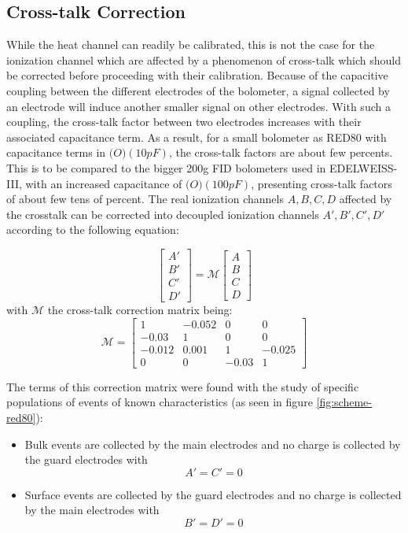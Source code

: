 \subsection{Cross-talk Correction}
\label{par:crosstalk}
While the heat channel can readily be calibrated, this is not the case for the ionization channel which are affected by a phenomenon of cross-talk which should be corrected before proceeding with their calibration.
Because of the capacitive coupling between the different electrodes of the bolometer, a signal collected by an electrode will induce another smaller signal on other electrodes. With such a coupling, the cross-talk factor between two electrodes increases with their associated capacitance term.
As a result, for a small bolometer as RED80 with capacitance terms in $\mathcal(O)(10 pF)$, the cross-talk factors are about few percents. This is to be compared to the bigger 200g FID bolometers used in EDELWEISS-III, with an increased capacitance of $\mathcal(O)(100 pF)$, presenting cross-talk factors of about few tens of percent.
The real ionization channels $A,B,C,D$ affected by the crosstalk can be corrected into decoupled ionization channels $A', B', C', D'$ according to the following equation:

\begin{equation}
	\left[\begin{array}{c}
	A' \\ 
	B' \\ 
	C' \\ 
	D'
	\end{array}\right]
	=
	\mathcal{M}
	\left[\begin{array}{c}
	A \\ 
	B \\ 
	C \\ 
	D
	\end{array} \right]
\end{equation}
with $\mathcal{M}$ the cross-talk correction matrix being:
\begin{equation}
	\mathcal{M}
	=
	\left[\begin{array}{cccc}
	1 & -0.052 & 0 & 0 \\ 
	-0.03 & 1 & 0 & 0 \\ 
	-0.012 & 0.001 & 1 & -0.025 \\ 
	0 & 0 & -0.03 & 1
	\end{array}\right]
\end{equation}

The terms of this correction matrix were found with the study of specific populations of events of known characteristics (as seen in figure \ref{fig:scheme-red80}):
\begin{itemize}
	\item Bulk events are collected by the main electrodes and no charge is collected by the guard electrodes with $$A'= C' = 0$$
	\item Surface events are collected by the guard electrodes and no charge is collected by the main electrodes with $$B' = D' = 0$$
\end{itemize}

